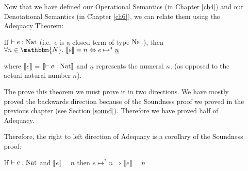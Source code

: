 Now that we have defined our Operational Semantics (in  Chapter \ref{ch4}) and our Denotational Semantics (in Chapter \ref{ch6}), we can relate them using the Adequacy Theorem: 

\vspace{1cm}
\begin{thm}\label{adeq}
If $\vdash e : \operatorname{Nat}$ (i.e.\ $e$ is a closed term of type $\operatorname{Nat}$), then $\forall n \in \mathbbm{N}. \ \llbracket e \rrbracket = n \Leftrightarrow e \mapsto^* \underline{n}$
\end{thm}

\vspace{0.5cm}

where $\llbracket e \rrbracket$ = $\llbracket \vdash e : \operatorname{Nat} \rrbracket$ and $\underline{n}$ represents the numeral $n$, (as opposed to the actual natural number $n$).

\vspace{0.5cm}


The prove this theorem we must prove it in two directions. We have mostly proved the backwards direction because of the Soundness proof we proved in the previous chapter (see Section \ref{sound}). Therefore we have proved half of Adequacy.

Therefore, the right to left direction of Adequacy is a corollary of the Soundness proof:

\vspace{0.5cm}

\begin{cor}
If $\vdash e : \operatorname{Nat}$ and $\llbracket e \rrbracket = n$ then $e \mapsto^* \underline{n} \Rightarrow \llbracket e \rrbracket = n$
\end{cor}


